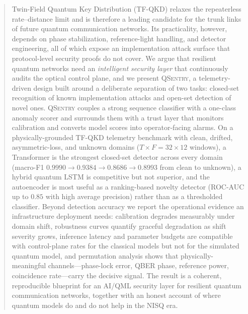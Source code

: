 \documentclass[runningheads]{llncs}
\begin{document}
\begin{abstract}
Twin-Field Quantum Key Distribution (TF-QKD) relaxes the repeaterless rate--distance limit and is therefore a leading candidate for the trunk links of future quantum communication networks. Its practicality, however, depends on phase stabilization, reference-light handling, and detector engineering, all of which expose an implementation attack surface that protocol-level security proofs do not cover. We argue that resilient quantum networks need an \emph{intelligent security layer} that continuously audits the optical control plane, and we present \textsc{QSentry}, a telemetry-driven design built around a deliberate separation of two tasks: closed-set recognition of known implementation attacks and open-set detection of novel ones. \textsc{QSentry} couples a strong sequence classifier with a one-class anomaly scorer and surrounds them with a trust layer that monitors calibration and converts model scores into operator-facing alarms. On a physically-grounded TF-QKD telemetry benchmark with clean, drifted, asymmetric-loss, and unknown domains ($T{\times}F = 32{\times}12$ windows), a Transformer is the strongest closed-set detector across every domain (macro-F1 $0.9990 \to 0.9384 \to 0.8686 \to 0.8993$ from clean to unknown), a hybrid quantum LSTM is competitive but not superior, and the autoencoder is most useful as a ranking-based novelty detector (ROC-AUC up to $0.85$ with high average precision) rather than as a thresholded classifier. Beyond detection accuracy we report the operational evidence an infrastructure deployment needs: calibration degrades measurably under domain shift, robustness curves quantify graceful degradation as shift severity grows, inference latency and parameter budgets are compatible with control-plane rates for the classical models but not for the simulated quantum model, and permutation analysis shows that physically-meaningful channels---phase-lock error, QBER phase, reference power, coincidence rate---carry the decisive signal. The result is a coherent, reproducible blueprint for an AI/QML security layer for resilient quantum communication networks, together with an honest account of where quantum models do and do not help in the NISQ era.
\end{abstract}

\end{document}
